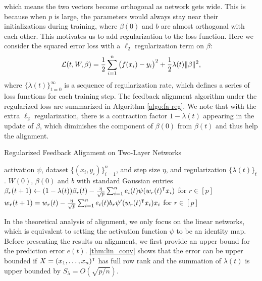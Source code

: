 which means the two vectors become orthogonal as network gets wide. This is because when $p$ is large, the parameters would always stay near their initializations during training, where $\beta(0)$ and $b$ are almost orthogonal with each other. This motivates us to add regularization to the loss function. Here we consider the squared error loss with a $\ell_2$ regularization term on $\beta$:
\begin{equation}
\label{eqn:loss-with-reg}
\mathcal{L}(t, W, \beta) = \frac{1}{2}\sum_{i=1}^n\big(f(x_i)-y_i\big)^2 + \frac{1}{2}\lambda(t)\|\beta\|^2,
\end{equation}
where $\{\lambda(t)\}_{t=0}^\infty$ is a sequence of regularization rate, which defines a series of loss functions for each training step. The feedback alignment algorithm under the regularized loss are summarized in Algorithm \ref{algo:fa-reg}. We note that with the extra $\ell_2$ regularization, there is a contraction factor $1-\lambda(t)$ appearing in the update of $\beta$, which diminishes the component of $\beta(0)$ from $\beta(t)$ and thus help the alignment.

\begin{algorithm}[H]
\centering
\caption{Regularized Feedback Alignment on Two-Layer Networks}\label{algo:fa-reg}
    \begin{algorithmic}[1]
        \Require activation $\psi$, dataset $\{(x_i,y_i)\}_{i=1}^n$, and step size $\eta$, and regularization $\{\lambda(t)\}_t$.
         $W(0)$, $\beta(0)$ and $b$ with standard Gaussian entries
            \State $\beta_r(t+1) \gets (1-\lambda(t))\beta_r(t) - \frac{\eta}{\sqrt p} \sum_{i=1}^n e_i(t)\psi(w_r(t)\transpose x_i)$ for $r\in[p]$
            \State $w_r(t+1) = w_r(t) - \frac{\eta}{\sqrt{p}} \sum_{i=1}^n e_i(t) b_r\psi'(w_r(t)\transpose x_i)x_i$ for $r\in[p]$
        \EndWhile
    \end{algorithmic}    
\end{algorithm}

In the theoretical analysis of alignment, we only focus on the linear networks, which is equivalent to setting the activation function $\psi$ to be an identity map. Before presenting the results on alignment, we first provide an upper bound for the prediction error $e(t)$. \cref{thm:lin_conv} shows that the error can be upper bounded if $X = (x_1,\ldots,x_n)\transpose$ has full row rank and the summation of $\lambda(t)$ is upper bounded by $S_\lambda = O(\sqrt{p/n})$.


